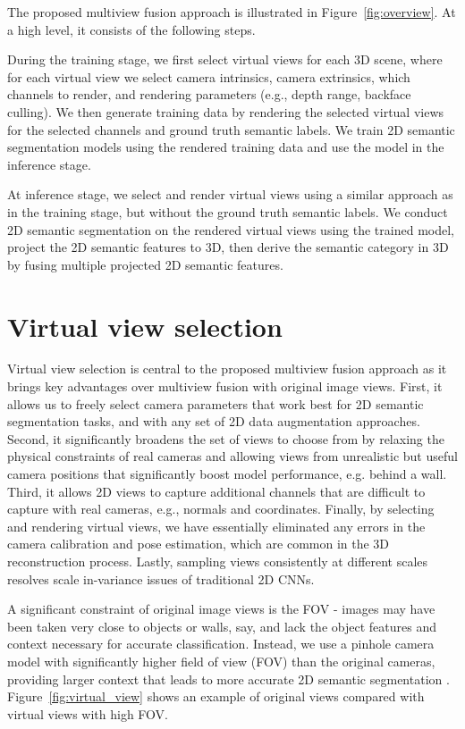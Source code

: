 \documentclass[runningheads]{llncs}
\begin{document}
The proposed multiview fusion approach is illustrated in Figure~\ref{fig:overview}. At a high level, it consists of the following steps.

\vspace*{2mm} During the training stage, we first select virtual views for each 3D scene, where for each virtual view we select camera intrinsics, camera extrinsics, which channels to render, and rendering parameters (e.g., depth range, backface culling). We then generate training data by rendering the selected virtual views for the selected channels and ground truth semantic labels. We train 2D semantic segmentation models using the rendered training data and use the model in the inference stage.

\vspace*{2mm} At inference stage, we select and render virtual views using a similar approach as in the training stage, but without the ground truth semantic labels. We conduct 2D semantic segmentation on the rendered virtual views using the trained model, project the 2D semantic features to 3D, then derive the semantic category in 3D by fusing multiple projected 2D semantic features.

\section{Virtual view selection}

Virtual view selection is central to the proposed multiview fusion approach as it brings key advantages over multiview fusion with original image views. First, it allows us to freely select camera parameters that work best for 2D semantic segmentation tasks, and with any set of 2D data augmentation approaches. Second, it significantly broadens the set of views to choose from by relaxing the physical constraints of real cameras and allowing views from unrealistic but useful camera positions that significantly boost model performance, e.g. behind a wall. Third, it allows 2D views to capture additional channels that are difficult to capture with real cameras, e.g., normals and coordinates. Finally, by selecting and rendering virtual views, we have essentially eliminated any errors in the camera calibration and pose estimation, which are common in the 3D reconstruction process. Lastly, sampling views consistently at different scales resolves scale in-variance issues of traditional 2D CNNs.

\vspace*{2mm} A significant constraint of original image views is the FOV - images may have been taken very close to objects or walls, say, and lack the object features and context necessary for accurate classification. Instead, we use a pinhole camera model with significantly higher field of view (FOV) than the original cameras, providing larger context that leads to more accurate 2D semantic segmentation \cite{Mottaghi_2014_CVPR}. Figure~\ref{fig:virtual_view} shows an example of original views compared with virtual views with high FOV.
\end{document}
